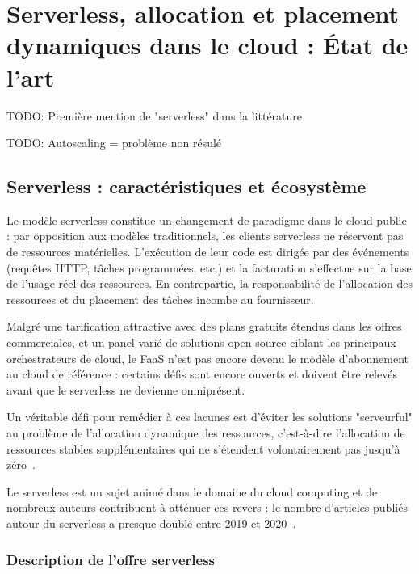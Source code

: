 \chapter{Serverless, allocation et placement dynamiques dans le cloud : État de l'art}

TODO: Première mention de "serverless" dans la littérature~\cite{andersonServerlessNetworkFile}

TODO: Autoscaling = problème non résulé~\cite{straesserWhyItNot2022}

\section{Serverless : caractéristiques et écosystème}

Le modèle serverless constitue un changement de paradigme dans le cloud public : par opposition aux modèles traditionnels, les clients serverless ne réservent pas de ressources matérielles. L'exécution de leur code est dirigée par des événements (requêtes HTTP, tâches programmées, etc.) et la facturation s'effectue sur la base de l'usage réel des ressources. En contrepartie, la responsabilité de l'allocation des ressources et du placement des tâches incombe au fournisseur.

Malgré une tarification attractive avec des plans gratuits étendus dans les offres commerciales, et un panel varié de solutions open source ciblant les principaux orchestrateurs de cloud, le FaaS n'est pas encore devenu le modèle d'abonnement au cloud de référence : certains défis sont encore ouverts et doivent être relevés avant que le serverless ne devienne omniprésent.

Un véritable défi pour remédier à ces lacunes est d'éviter les solutions "serveurful" au problème de l'allocation dynamique des ressources, c'est-à-dire l'allocation de ressources stables supplémentaires qui ne s'étendent volontairement pas jusqu'à zéro~\cite{hellersteinServerlessComputingOne2019}.

Le serverless est un sujet animé dans le domaine du cloud computing et de nombreux auteurs contribuent à atténuer ces revers : le nombre d'articles publiés autour du serverless a presque doublé entre 2019 et 2020~\cite{hassanSurveyServerlessComputing2021}.

\subsection{Description de l'offre serverless}

